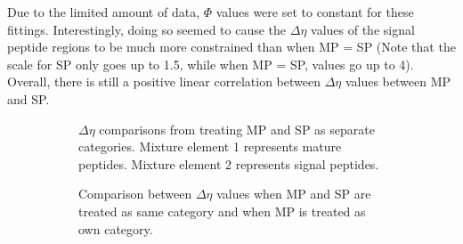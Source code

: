 \documentclass[11pt]{labbook}
\begin{document}
Due to the limited amount of data, $\Phi$ values were set to constant for these fittings. Interestingly, doing so seemed to cause the $\Delta\eta$ values of the signal peptide regions to be much more constrained than when MP = SP (Note that the scale for SP only goes up to 1.5, while when MP = SP, values go up to 4). Overall, there is still a positive linear correlation between $\Delta\eta$ values between MP and SP.
\begin{figure}
\begin{center}
\begin{subfigure}{0.6\textwidth}
\caption{$\Delta\eta$ comparisons from treating MP and SP as separate categories. Mixture element 1 represents mature peptides. Mixture element 2 represents signal peptides.}
\end{subfigure}%
\end{center}
\begin{subfigure}{0.52\textwidth}
\caption{Comparison between $\Delta\eta$ values when MP and SP are treated as same category and when MP is treated as own category.}
\end{subfigure}%
\begin{subfigure}{0.52\textwidth}

\end{subfigure}
\end{figure}
\end{document}
